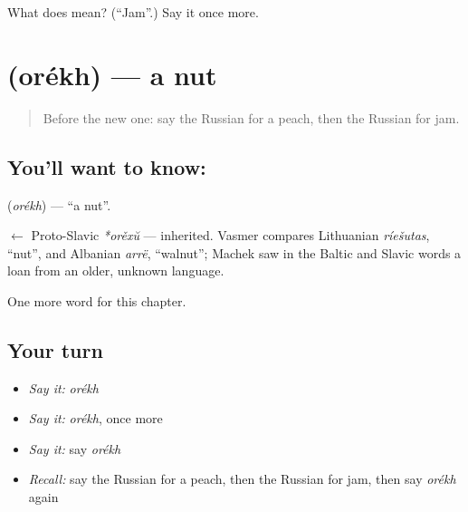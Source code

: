 \begin{tcolorbox}[breakable,colback=teal!4,colframe=teal!35!black,title={Before you move on}]
What does  mean? (\textquotedblleft{}Jam\textquotedblright{}.) Say it once more.
\end{tcolorbox}
\section[\texorpdfstring{\ru{орех} (orékh)}{орех (orékh)}]{ (orékh) — a nut}

\label{lesson:RU-C107-nut}



\begin{quote}
Before the new one: say the Russian for a peach, then the Russian for jam.
\end{quote}

\subsection*{You'll want to know: }
\textbf{} (\emph{orékh}) — \textquotedblleft{}a nut\textquotedblright{}.

\begin{cousinweb}
\textbf{} $\leftarrow$ Proto-Slavic \emph{*orěxŭ} — inherited. Vasmer compares Lithuanian \emph{ríešutas}, \textquotedblleft{}nut\textquotedblright{}, and Albanian \emph{arrë}, \textquotedblleft{}walnut\textquotedblright{}; Machek saw in the Baltic and Slavic words a loan from an older, unknown language.
\end{cousinweb}

\begin{grammarlens}[title={What you've built}]
One more word for this chapter.
\end{grammarlens}

\subsection*{Your turn}
\begin{itemize}
\raggedright
  \item \emph{Say it:} \emph{orékh}
  \item \emph{Say it:} \emph{orékh}, once more
  \item \emph{Say it:} say \emph{orékh}
  \item \emph{Recall:} say the Russian for a peach, then the Russian for jam, then say \emph{orékh} again
\end{itemize}

